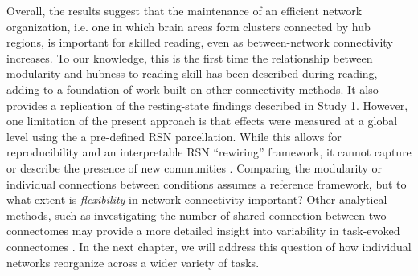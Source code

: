 Overall, the results suggest that the maintenance of an efficient network organization, i.e. one in which brain areas form clusters connected by hub regions, is important for skilled reading, even as between-network connectivity increases. To our knowledge, this is the first time the relationship between modularity and hubness to reading skill has been described during reading, adding to a foundation of work built on other connectivity methods. It also provides a replication of the resting-state findings described in Study 1. However, one limitation of the present approach is that effects were measured at a global level using the a pre-defined RSN parcellation. While this allows for reproducibility and an interpretable RSN ``rewiring'' framework, it cannot capture or describe the presence of new communities \citep{Power2011}. Comparing the modularity or individual connections between conditions assumes a reference framework, but to what extent is \textit{flexibility} in network connectivity important? Other analytical methods, such as investigating the number of shared connection between two connectomes may provide a more detailed insight into variability in task-evoked connectomes \citep{Petersen2015}. In the next chapter, we will address this question of how individual networks reorganize across a wider variety of tasks.
